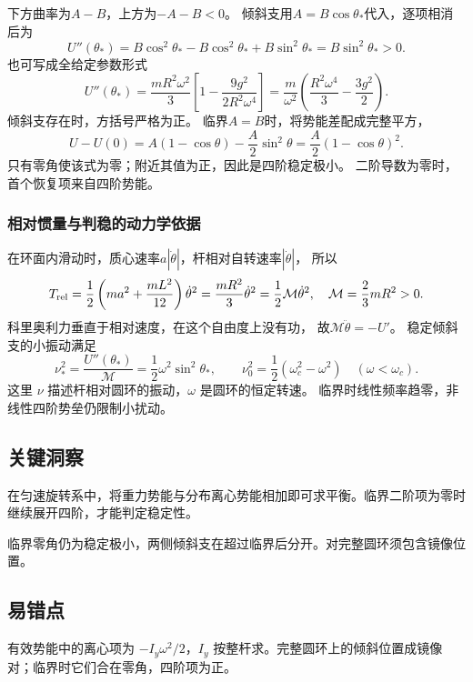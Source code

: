 \documentclass[UTF8,fontset=fandol,a4paper,11pt]{ctexart}
\begin{document}
下方曲率为$A-B$，上方为$-A-B<0$。
倾斜支用$A=B\cos\theta_*$代入，逐项相消后为
\[
U''(\theta_*)=B\cos^2\theta_*
-B\cos^2\theta_*+B\sin^2\theta_*=B\sin^2\theta_*>0.
\]
也可写成全给定参数形式
\[
U''(\theta_*)=\frac{mR^2\omega^2}{3}
\left[1-\frac{9g^2}{2R^2\omega^4}\right]
=\frac m{\omega^2}\left(\frac{R^2\omega^4}{3}-\frac{3g^2}{2}\right).
\]
倾斜支存在时，方括号严格为正。
临界$A=B$时，将势能差配成完整平方，
\[
U-U(0)=A(1-\cos\theta)-\frac A2\sin^2\theta
=\frac A2(1-\cos\theta)^2.
\]
只有零角使该式为零；附近其值为正，因此是四阶稳定极小。
二阶导数为零时，首个恢复项来自四阶势能。

\subsubsection*{相对惯量与判稳的动力学依据}
在环面内滑动时，质心速率$a|\dot\theta|$，杆相对自转速率$|\dot\theta|$，
所以
\[
T_{\rm rel}=\frac12\left(ma^2+\frac{mL^2}{12}\right)\dot\theta^2
=\frac{mR^2}{3}\dot\theta^2=\frac12\mathcal M\dot\theta^2,
\quad\mathcal M=\frac23mR^2>0.
\]
科里奥利力垂直于相对速度，在这个自由度上没有功，
故$\mathcal M\ddot\theta=-U'$。
稳定倾斜支的小振动满足
\[
\nu_*^2=\frac{U''(\theta_*)}{\mathcal M}
=\frac12\omega^2\sin^2\theta_*,
\qquad \nu_0^2=\frac12(\omega_c^2-\omega^2)
\quad(\omega<\omega_c).
\]
这里 $\nu$ 描述杆相对圆环的振动，$\omega$ 是圆环的恒定转速。
临界时线性频率趋零，非线性四阶势垒仍限制小扰动。




\subsection*{关键洞察}

在匀速旋转系中，将重力势能与分布离心势能相加即可求平衡。临界二阶项为零时继续展开四阶，才能判定稳定性。

临界零角仍为稳定极小，两侧倾斜支在超过临界后分开。对完整圆环须包含镜像位置。



\subsection*{易错点}

有效势能中的离心项为 $-I_y\omega^2/2$，$I_y$ 按整杆求。完整圆环上的倾斜位置成镜像对；临界时它们合在零角，四阶项为正。
\end{document}
